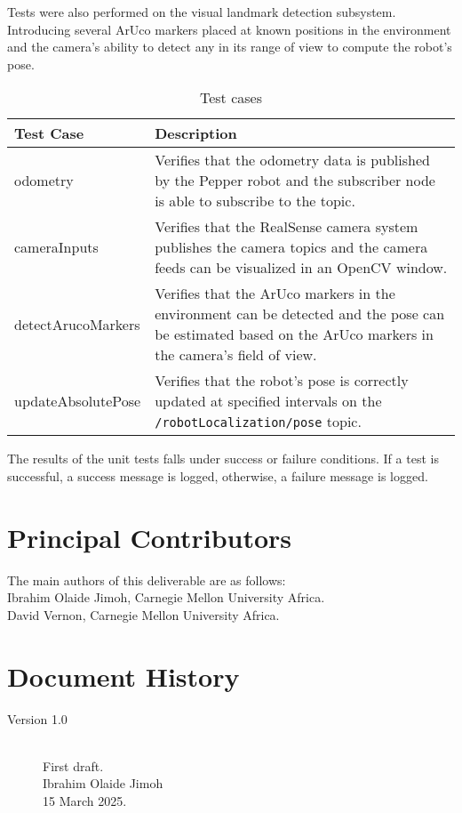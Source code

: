 \documentclass{CSSRforAfrica}
\newcommand{\blank}{~\\}
\begin{document}
Tests were also performed on the visual landmark detection subsystem. Introducing several ArUco markers placed at known positions in the environment and the camera's ability to detect any in its range of view to compute the robot's pose.


\begin{table}[H]
\centering
\caption{Test cases}
\label{tab:test_cases}
\begin{tabularx}{\textwidth}{|l|X|}
\hline
\textbf{Test Case} & \textbf{Description} \\ \hline
odometry & Verifies that the odometry data is published by the Pepper robot and the subscriber node is able to subscribe to the topic. \\ \hline
cameraInputs & Verifies that the RealSense camera system publishes the camera topics and the camera feeds can be visualized in an OpenCV window. \\ \hline
detectArucoMarkers & Verifies that the ArUco markers in the environment can be detected and the pose can be estimated based on the ArUco markers in the camera's field of view. \\ \hline
updateAbsolutePose & Verifies that the robot's pose is correctly updated at specified intervals on the \texttt{/robotLocalization/pose} topic. \\ \hline
\end{tabularx}
\end{table}

The results of the unit tests falls under success or failure conditions. If a test is successful, a success message is logged, otherwise, a failure message is logged.



\newpage


\pagebreak
\section*{Principal Contributors}
\label{contributors}
The main authors of this deliverable are as follows:
\blank
Ibrahim Olaide Jimoh, Carnegie Mellon University Africa.
\blank
David Vernon, Carnegie Mellon University Africa.

\newpage
\section*{Document History}
\label{document_history}

\begin{description}

\item [Version 1.0]~\\
First draft. \\
Ibrahim Olaide Jimoh \\
15 March 2025.

\end{description}
\end{document}
